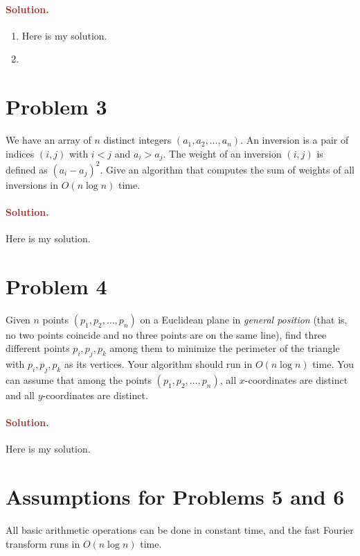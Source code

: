 \paragraph{\textcolor{brown}{Solution.}}
\begin{enumerate}
    \item Here is my solution.
    \item 
\end{enumerate}


\section*{Problem 3}
We have an array of $n$ distinct integers $(a_1, a_2, \ldots, a_n)$. An inversion is a pair of indices $(i, j)$ with $i < j$ and $a_i > a_j$. The weight of an inversion $(i, j)$ is defined as $(a_i - a_j)^2$. Give an algorithm that computes the sum of weights of all inversions in $O(n \log n)$ time.

\paragraph{\textcolor{brown}{Solution.}}
Here is my solution.

\section*{Problem 4}
Given $n$ points $(p_1, p_2, \ldots, p_n)$ on a Euclidean plane in \emph{general position} (that is, no two points coincide and no three points are on the same line), find three different points $p_i, p_j, p_k$ among them to minimize the perimeter of the triangle with $p_i, p_j, p_k$ as its vertices. Your algorithm should run in $O(n \log n)$ time. You can assume that among the points $(p_1, p_2, \ldots, p_n)$, all $x$-coordinates are distinct and all $y$-coordinates are distinct.

\paragraph{\textcolor{brown}{Solution.}}
Here is my solution.

\section*{Assumptions for Problems 5 and 6}
All basic arithmetic operations can be done in constant time, and the fast Fourier transform runs in $O(n \log n)$ time.

